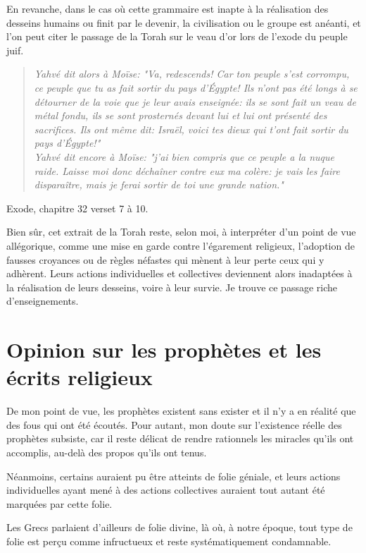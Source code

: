 En revanche, dans le cas où cette grammaire est inapte à la réalisation des desseins humains ou finit par le devenir, la civilisation ou le groupe est anéanti, et l’on peut citer le passage de la Torah sur le veau d’or lors de l'exode du peuple juif.


\begin{center}
\begin{quote}
\textit{Yahvé dit alors à Moïse: "Va, redescends! Car ton peuple s'est corrompu, ce peuple que tu as fait sortir du pays d'\'Egypte! Ils n'ont pas été longs à se détourner de la voie que je leur avais enseignée: ils se sont fait un veau de métal fondu, ils se sont prosternés devant lui et lui ont présenté des sacrifices. Ils ont même dit: Israël, voici tes dieux qui t'ont fait sortir du pays d'\'Egypte!" \\ Yahvé dit encore à Moïse: "j'ai bien compris que ce peuple a la nuque raide. Laisse moi donc déchaîner contre eux ma colère: je vais les faire disparaître, mais je ferai sortir de toi une grande nation."}
\end{quote}
Exode, chapitre 32 verset 7 à 10.
\end{center}

Bien sûr, cet extrait de la Torah reste, selon moi, à interpréter d'un point de vue allégorique, comme une mise en garde contre l'égarement religieux, l'adoption de fausses croyances ou de règles néfastes qui mènent à leur perte ceux qui y adhèrent. Leurs actions individuelles et collectives deviennent alors inadaptées à la réalisation de leurs desseins, voire à leur survie. Je trouve ce passage riche d'enseignements.


\chapter{Opinion sur les prophètes et les écrits religieux}

De mon point de vue, les prophètes existent sans exister et il n'y a en réalité que des fous qui ont été écoutés. Pour autant, mon doute sur l'existence réelle des prophètes subsiste, car il reste délicat de rendre rationnels les miracles qu'ils ont accomplis, au-delà des propos qu'ils ont tenus.

Néanmoins, certains auraient pu être atteints de folie géniale, et leurs actions individuelles ayant mené à des actions collectives auraient tout autant été marquées par cette folie.

Les Grecs parlaient d'ailleurs de folie divine, là où, à notre époque, tout type de folie est perçu comme infructueux et reste systématiquement condamnable.

